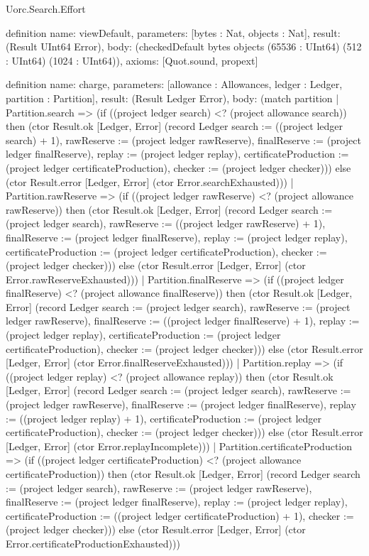 \begin{lexlean}{Uorc.Search.Effort}
\begin{semanticmodule}
definition{
  name: viewDefault,
  parameters: [bytes : Nat, objects : Nat],
  result: (Result UInt64 Error),
  body: (checkedDefault bytes objects (65536 : UInt64) (512 : UInt64) (1024 : UInt64)),
  axioms: [Quot.sound, propext]
}

definition{
  name: charge,
  parameters: [allowance : Allowances, ledger : Ledger, partition : Partition],
  result: (Result Ledger Error),
  body: (match partition
    | Partition.search => (if ((project ledger search) <? (project allowance search)) then (ctor Result.ok [Ledger, Error] (record Ledger {search := ((project ledger search) + 1), rawReserve := (project ledger rawReserve), finalReserve := (project ledger finalReserve), replay := (project ledger replay), certificateProduction := (project ledger certificateProduction), checker := (project ledger checker)})) else (ctor Result.error [Ledger, Error] (ctor Error.searchExhausted)))
    | Partition.rawReserve => (if ((project ledger rawReserve) <? (project allowance rawReserve)) then (ctor Result.ok [Ledger, Error] (record Ledger {search := (project ledger search), rawReserve := ((project ledger rawReserve) + 1), finalReserve := (project ledger finalReserve), replay := (project ledger replay), certificateProduction := (project ledger certificateProduction), checker := (project ledger checker)})) else (ctor Result.error [Ledger, Error] (ctor Error.rawReserveExhausted)))
    | Partition.finalReserve => (if ((project ledger finalReserve) <? (project allowance finalReserve)) then (ctor Result.ok [Ledger, Error] (record Ledger {search := (project ledger search), rawReserve := (project ledger rawReserve), finalReserve := ((project ledger finalReserve) + 1), replay := (project ledger replay), certificateProduction := (project ledger certificateProduction), checker := (project ledger checker)})) else (ctor Result.error [Ledger, Error] (ctor Error.finalReserveExhausted)))
    | Partition.replay => (if ((project ledger replay) <? (project allowance replay)) then (ctor Result.ok [Ledger, Error] (record Ledger {search := (project ledger search), rawReserve := (project ledger rawReserve), finalReserve := (project ledger finalReserve), replay := ((project ledger replay) + 1), certificateProduction := (project ledger certificateProduction), checker := (project ledger checker)})) else (ctor Result.error [Ledger, Error] (ctor Error.replayIncomplete)))
    | Partition.certificateProduction => (if ((project ledger certificateProduction) <? (project allowance certificateProduction)) then (ctor Result.ok [Ledger, Error] (record Ledger {search := (project ledger search), rawReserve := (project ledger rawReserve), finalReserve := (project ledger finalReserve), replay := (project ledger replay), certificateProduction := ((project ledger certificateProduction) + 1), checker := (project ledger checker)})) else (ctor Result.error [Ledger, Error] (ctor Error.certificateProductionExhausted)))
}
\end{semanticmodule}
\end{lexlean}
